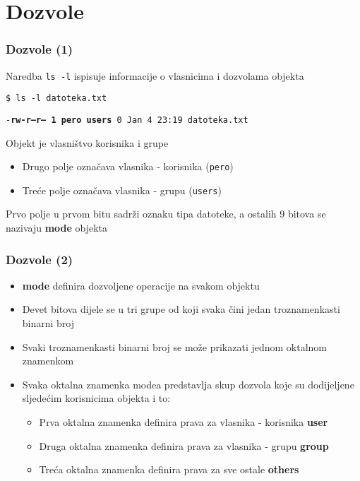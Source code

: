 \documentclass[table,usenames,dvipsnames] {beamer}
\newcommand{\shell}[1]{\texttt{#1}}
\begin{document}
\section{Dozvole}
\begin{frame}[t]
\frametitle{Dozvole (1)}
\begin{itemize}
  \item Naredba \shell{ls -l} ispisuje informacije o vlasnicima i dozvolama objekta
  {\small \item[] \shell{\$ ls -l datoteka.txt}
  \item[] \shell{-\textbf{rw-r--r-- 1 pero users} 0 Jan  4 23:19 datoteka.txt}}
  \vfill
    \item Objekt je vlasništvo korisnika i grupe
    \begin{itemize}
    \item Drugo polje označava vlasnika - korisnika \hfill (\shell{pero}) \hfill \,
    \item Treće polje označava vlasnika - grupu \hfill (\shell{users}) \hfill \,
    \end{itemize}
    \item Prvo polje u prvom bitu sadrži oznaku tipa datoteke, a ostalih 9 bitova se nazivaju \textbf{mode} objekta
  \end{itemize}
\end{frame}

\begin{frame}[t]
\frametitle{Dozvole (2)}
\begin{itemize}
  \item \textbf{mode} definira dozvoljene operacije na svakom objektu
  \vspace{1em}
  \item Devet bitova dijele se u tri grupe od koji svaka čini jedan troznamenkasti binarni broj
  \item Svaki troznamenkasti binarni broj se može prikazati jednom oktalnom znamenkom
\end{itemize}
\begin{itemize}
  \item Svaka oktalna znamenka modea predstavlja skup dozvola koje su dodijeljene sljedećim korisnicima objekta i to:
  \begin{itemize}
  \item Prva oktalna znamenka definira prava za vlasnika - korisnika \hfill \textbf{user}
    \item Druga oktalna znamenka definira prava za vlasnika - grupu \hfill \textbf{group}
    \item Treća oktalna znamenka definira prava za sve ostale \hfill \textbf{others}
  \end{itemize}
\end{itemize}
\end{frame}
\end{document}
